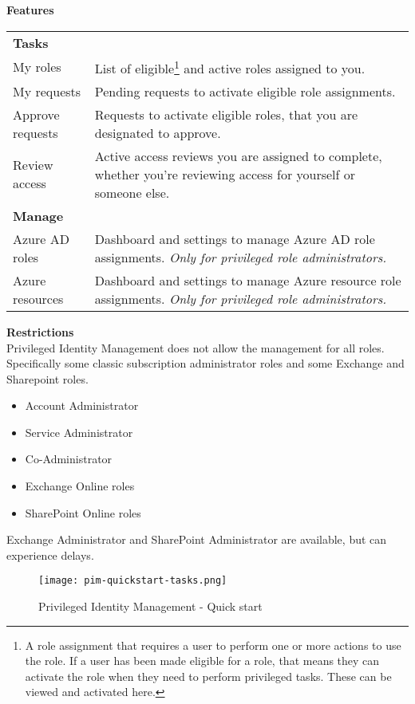\textbf{Features} \\
\begin{tabular}{p{3cm} p{12cm}}
\textbf{Tasks} \\
My roles & List of eligible\footnote{A role assignment that requires a user to perform one or more actions to use the role. If a user has been made eligible for a role, that means they can activate the role when they need to perform privileged tasks. These can be viewed and activated here.} and active roles assigned to you. \\
My requests & Pending requests to activate eligible role assignments. \\
Approve requests & Requests to activate eligible roles, that you are designated to approve. \\
Review access & Active access reviews you are assigned to complete, whether you're reviewing access for yourself or someone else. \\
\textbf{Manage} \\
Azure AD roles & Dashboard and settings to manage Azure AD role assignments. \newline \textit{Only for privileged role administrators.} \\
Azure resources & Dashboard and settings to manage Azure resource role assignments. \newline \textit{Only for privileged role administrators.} \\
\end{tabular}

\textbf{Restrictions} \\
Privileged Identity Management does not allow the management for all roles. Specifically some classic subscription administrator roles and some Exchange and Sharepoint roles.
\begin{itemize}
\item Account Administrator
\item Service Administrator
\item Co-Administrator
\item Exchange Online roles 
\item SharePoint Online roles
\end{itemize}
Exchange Administrator and SharePoint Administrator are available, but can experience delays. 

\begin{figure}[!h]
\centering
\texttt{[image: pim-quickstart-tasks.png]}
\caption{Privileged Identity Management - Quick start}
\label{fig:azure-connect-accounts}
\end{figure}

